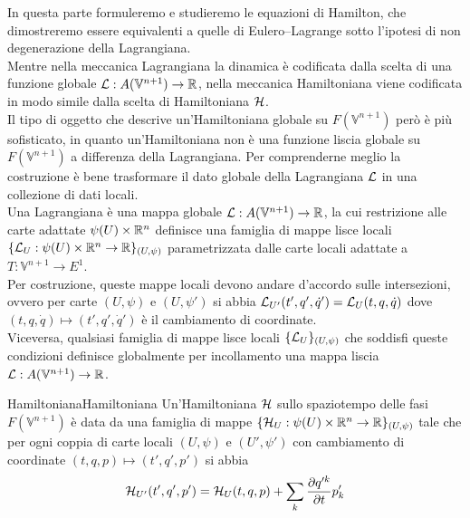 \documentclass[openany]{book}
\renewcommand\V{\mathbb{V}}
\begin{document}
In questa parte formuleremo e studieremo le equazioni di Hamilton, che dimostreremo essere equivalenti a quelle di Eulero--Lagrange sotto l'ipotesi di non degenerazione della Lagrangiana.\\
Mentre nella meccanica Lagrangiana la dinamica è codificata dalla scelta di una funzione globale $\L:A(\V^{n+1})\to\R$, nella meccanica Hamiltoniana viene codificata in modo simile dalla scelta di Hamiltoniana $\mathcal{H}$.\\
Il tipo di oggetto che descrive un'Hamiltoniana globale su $F(\V^{n+1})$ però è più sofisticato, in quanto un'Hamiltoniana non è una funzione liscia globale su $F(\V^{n+1})$ a differenza della Lagrangiana. Per comprenderne meglio la costruzione è bene trasformare il dato globale della Lagrangiana $\mathcal{L}$ in una collezione di dati locali.\\
Una Lagrangiana è una mappa globale $\L:A(\V^{n+1})\to\R$, la cui restrizione alle carte adattate $\psi(U)\times\mathbb{R}^n$ definisce una famiglia di mappe lisce locali $\{ \mathcal{L}_U:\psi(U)\times\mathbb{R}^n\to\mathbb{R} \}_{(U,\psi)}$ parametrizzata dalle carte locali adattate a $T:\V^{n+1}\to E^1$.\\
Per costruzione, queste mappe locali devono andare d'accordo sulle intersezioni, ovvero per carte $(U,\psi)$ e $(U,\psi')$ si abbia $\mathcal{L}_{U'}(t',q',\dot q') = \mathcal{L}_U(t,q,\dot q)$ dove $(t,q,\dot q)\mapsto (t',q',\dot q')$ è il cambiamento di coordinate.\\
Viceversa, qualsiasi famiglia di mappe lisce locali $\{\mathcal{L}_U\}_{(U,\psi)}$ che soddisfi queste condizioni definisce globalmente per incollamento una mappa liscia $\L : A(\V^{n+1})\to\R$.

\begin{definition}{Hamiltoniana}{Hamiltoniana}
    Un'Hamiltoniana $\mathcal{H}$ sullo spaziotempo delle fasi $F(\V^{n+1})$ è data da una famiglia di mappe $\{\mathcal{H}_U: \psi(U)\times\mathbb{R}^n\to\mathbb{R}\}_{(U,\psi)}$ tale che per ogni coppia di carte locali $(U,\psi)$ e $(U',\psi')$ con cambiamento di coordinate $(t,q,p)\mapsto (t',q',p')$ si abbia 
    \[ \mathcal{H}_{U'}(t',q',p')  = \mathcal{H}_U(t,q,p) +\sum_k \frac{\partial q'^k}{\partial t}p'_k \]
\end{definition}
\end{document}
